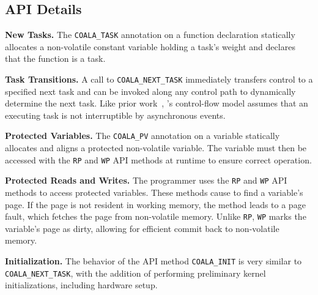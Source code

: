 \subsection{API Details}

\textbf{New Tasks.} The \texttt{COALA\_TASK} annotation on a function
declaration statically allocates a non-volatile constant variable holding a
task's weight and declares that the function is a task.

\textbf{Task Transitions.} A call to \texttt{COALA\_NEXT\_TASK} immediately
transfers control to a specified next task and can be invoked along
any control path to dynamically determine the next task.
Like prior work~\cite{chain,dino,ratchet}, \sys's control-flow model
assumes that an executing task is not interruptible by asynchronous events.  

\textbf{Protected Variables.} The \texttt{COALA\_PV} annotation on a
variable statically allocates and aligns a protected non-volatile variable. The
variable must then be accessed with the \texttt{RP} and \texttt{WP} API methods at
runtime to ensure correct operation.

\textbf{Protected Reads and Writes.} The programmer uses the \texttt{RP} and \texttt{WP} API
methods to access protected variables.  These methods cause \sys to find a variable's page.
If the page is not resident in working memory, the method leads to a page fault,
which fetches the page from non-volatile memory. Unlike \texttt{RP},
\texttt{WP} marks the variable's page as dirty, allowing for efficient 
commit back to non-volatile memory. 

\textbf{Initialization.} The behavior of the API method
\texttt{COALA\_INIT} is very similar to \texttt{COALA\_NEXT\_TASK}, with the
addition of performing preliminary kernel initializations, including hardware setup.



